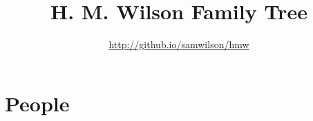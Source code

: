 \documentclass[a4paper, twoside]{book}
\title{H. M. Wilson Family Tree}
\author{\url{http://github.io/samwilson/hmw}}
\begin{document}
\maketitle
\tableofcontents

\chapter{People}










\printindex
\end{document}

